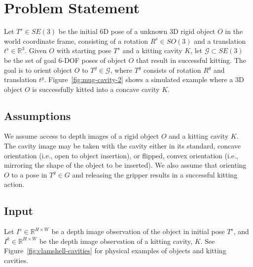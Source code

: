 \section{Problem Statement}
\label{sec:problem-statement}
Let $T^s \in SE(3)$ be the initial 6D pose of a unknown 3D rigid object $O$ in the world coordinate frame, consisting of a rotation $R^s \in SO(3)$ and a translation $t^s \in \mathbb{R}^3$. Given $O$ with starting pose $T^s$ and a kitting cavity $K$, let $\mathcal{G} \subset SE(3)$ be the set of goal 6-DOF poses of object $O$ that result in successful kitting. The goal is to orient object $O$ to $T^g \in \mathcal{G}$, where $T^g$ consists of rotation $R^g$ and translation $t^g$. Figure~\ref{fig:mug-cavity-2} shows a simulated example where a 3D object $O$ is successfully kitted into a concave cavity $K$.

\subsection{Assumptions}
\label{subsec:formulation}
We assume access to depth images of a rigid object $O$ and a kitting cavity $K$. The cavity image may be taken with the cavity either in its standard, concave orientation (i.e., open to object insertion), or flipped, convex orientation (i.e., mirroring the shape of the object to be inserted).
We also assume that orienting $O$ to a pose in $T^g \in G$ and releasing the gripper results in a successful kitting action.


\subsection{Input}
\label{subsec:input}
Let $I^s \in \mathbb{R}^{H \times W}$ be a depth image observation of the object in initial pose $T^s$, and
$I^k \in \mathbb{R}^{H \times W}$ be the depth image observation of a kitting cavity, $K$. See Figure~\ref{fig:clamshell-cavities} for physical examples of objects and kitting cavities.

